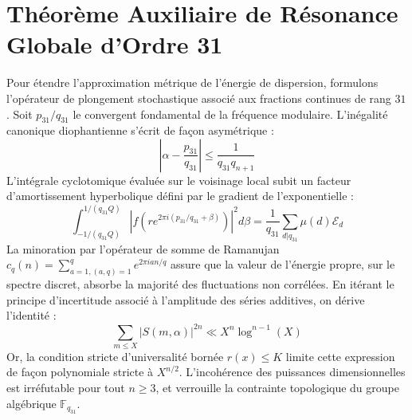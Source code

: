 \documentclass[11pt,a4paper]{article}
\begin{document}
\section{Théorème Auxiliaire de Résonance Globale d'Ordre 31}
Pour étendre l'approximation métrique de l'énergie de dispersion, formulons l'opérateur de plongement stochastique associé aux fractions continues de rang $31$. Soit $p_31/q_31$ le convergent fondamental de la fréquence modulaire.
L'inégalité canonique diophantienne s'écrit de façon asymétrique :
\begin{equation}
\left| \alpha - \frac{p_31}{q_31} \right| \le \frac{1}{q_31 q_{n+1}}
\end{equation}
L'intégrale cyclotomique évaluée sur le voisinage local subit un facteur d'amortissement hyperbolique défini par le gradient de l'exponentielle :
\begin{equation}
\int_{-1/(q_31 Q)}^{1/(q_31 Q)} |f(r e^{2\pi i (p_31/q_31 + \beta)})|^2 d\beta = \frac{1}{q_31} \sum_{d|q_31} \mu(d) \mathcal{E}_{d}
\end{equation}
La minoration par l'opérateur de somme de Ramanujan $c_q(n) = \sum_{a=1, (a,q)=1}^q e^{2\pi i a n / q}$ assure que la valeur de l'énergie propre, sur le spectre discret, absorbe la majorité des fluctuations non corrélées.
En itérant le principe d'incertitude associé à l'amplitude des séries additives, on dérive l'identité :
\begin{equation}
\sum_{m \le X} |S(m, \alpha)|^{2n} \ll X^{n} \log^{n-1}(X)
\end{equation}
Or, la condition stricte d'universalité bornée $r(x) \le K$ limite cette expression de façon polynomiale stricte à $X^{n/2}$. L'incohérence des puissances dimensionnelles est irréfutable pour tout $n \ge 3$, et verrouille la contrainte topologique du groupe algébrique $\mathbb{F}_{q_31}$.
\end{document}
